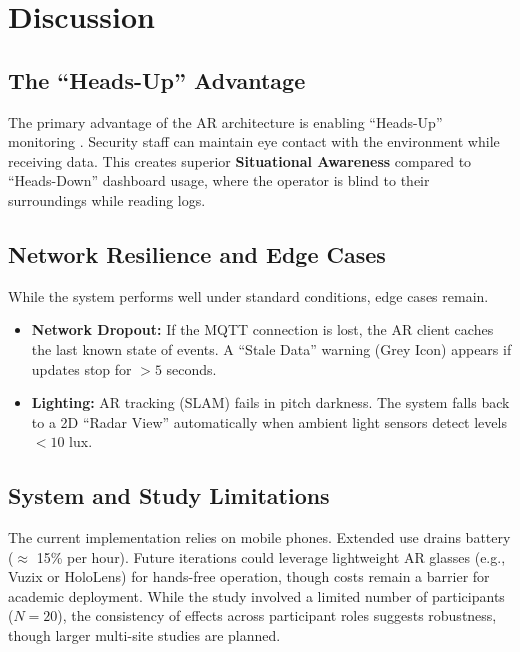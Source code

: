 \documentclass[conference]{IEEEtran}
\begin{document}
\section{Discussion}

\subsection{The ``Heads-Up'' Advantage}
The primary advantage of the AR architecture is enabling ``Heads-Up'' monitoring \cite{b5}. Security staff can maintain eye contact with the environment while receiving data. This creates superior \textbf{Situational Awareness} compared to ``Heads-Down'' dashboard usage, where the operator is blind to their surroundings while reading logs.

\subsection{Network Resilience and Edge Cases}
While the system performs well under standard conditions, edge cases remain.
\begin{itemize}
    \item \textbf{Network Dropout:} If the MQTT connection is lost, the AR client caches the last known state of events. A ``Stale Data'' warning (Grey Icon) appears if updates stop for $>5$ seconds.
    \item \textbf{Lighting:} AR tracking (SLAM) fails in pitch darkness. The system falls back to a 2D ``Radar View'' automatically when ambient light sensors detect levels $<10$ lux.
\end{itemize}

\subsection{System and Study Limitations}
The current implementation relies on mobile phones. Extended use drains battery ($\approx$ 15\% per hour). Future iterations could leverage lightweight AR glasses (e.g., Vuzix or HoloLens) for hands-free operation, though costs remain a barrier for academic deployment. While the study involved a limited number of participants ($N=20$), the consistency of effects across participant roles suggests robustness, though larger multi-site studies are planned. 

\end{document}
